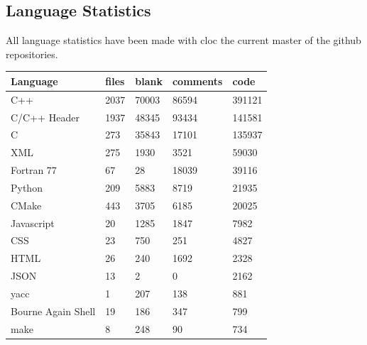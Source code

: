 \begin{appendix}
\section{Language Statistics}

All language statistics have been made with cloc \cite{CLOC} the current master of the github repositories.

\begin{table}[htbp]
    \centering
    \caption{Paraview, language statistic}
    \begin{longtable}{ l|l|l|l|l }
        \hline
        \textbf{Language}              &\textbf{files} &\textbf{blank} &\textbf{comments} & \textbf{code} \\
        \hline
        C++                            &2037          &70003         &86594         & 391121\\
        C/C++ Header                   &1937          &48345         & 93434        & 141581\\
        C                              & 273          &35843         & 17101        & 135937\\
        XML                            & 275          & 1930         &  3521        &  59030\\
        Fortran 77                     &  67          &   28         & 18039        &  39116\\
        Python                         & 209          & 5883         &  8719        &  21935\\
        CMake                          & 443          & 3705         &  6185        &  20025\\
        Javascript                     &  20          & 1285         &  1847        &   7982\\
        CSS                            &  23          &  750         &   251        &   4827\\
        HTML                           &  26          &  240         &  1692        &   2328\\
        JSON                           &  13          &    2         &     0        &   2162\\
        yacc                           &   1          &  207         &   138        &    881\\
        Bourne Again Shell             &  19          &  186         &   347        &    799\\
        make                           &   8          &  248         &    90        &    734\\

\end{longtable}
\end{table}
\end{appendix}
